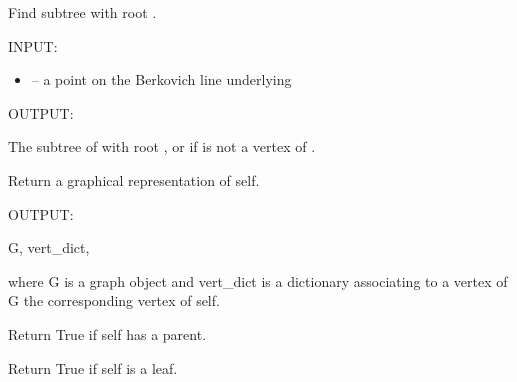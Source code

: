 \documentclass[letterpaper,10pt,english]{sphinxmanual}
\begin{document}
\begin{fulllineitems}
\begin{fulllineitems}
\end{fulllineitems}


\begin{fulllineitems}
\label{berkovich_trees:mclf.berkovich.berkovich_trees.BerkovichTree.find_point}
Find subtree with root .

INPUT:
\begin{itemize}
\item {} 
 -- a point on the Berkovich line underlying 

\end{itemize}

OUTPUT:

The subtree  of  with root , or  if 
is not a vertex of .

\end{fulllineitems}


\begin{fulllineitems}
\label{berkovich_trees:mclf.berkovich.berkovich_trees.BerkovichTree.graph}
Return a graphical representation of self.

OUTPUT:

G, vert\_dict,

where G is a graph object and vert\_dict is a dictionary associating
to a vertex of G the corresponding vertex of self.

\end{fulllineitems}


\begin{fulllineitems}
\label{berkovich_trees:mclf.berkovich.berkovich_trees.BerkovichTree.has_parent}
Return True if self has a parent.

\end{fulllineitems}


\begin{fulllineitems}
\label{berkovich_trees:mclf.berkovich.berkovich_trees.BerkovichTree.is_leaf}
Return True if self is a leaf.


\end{fulllineitems}
\end{fulllineitems}
\end{document}
